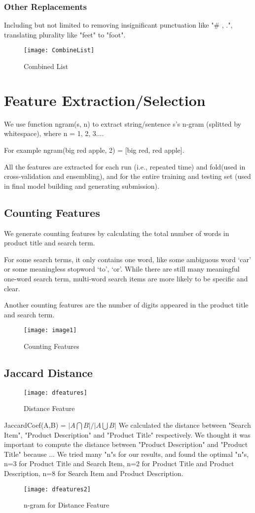 \documentclass[journal]{IEEEtran}
\begin{document}
\subsubsection{Other Replacements}
Including but not limited to removing insignificant punctuation like "\# , .", translating plurality like "feet" to "foot".
\begin{figure}[htbp] 
\centering\texttt{[image: CombineList]} 
\caption{Combined List}\label{fig:3} 
\end{figure} 
\section{Feature Extraction/Selection}
We use function ngram(s, n) to extract string/sentence s’s n-gram (splitted by whitespace), where n = 1, 2, 3....

For example ngram(big red apple, 2) = [big red, red apple].

All the features are extracted for each run (i.e., repeated time) and fold(used in cross-validation and ensembling), and for the entire training and testing set (used in final model building and generating submission).
\subsection{Counting Features}
We generate counting features by calculating the total number of words in product title and search term. 

For some search terms, it only contains one word, like some ambiguous word ‘car’ or some meaningless stopword ‘to’, ‘or’. While there are still many meaningful one-word search term, multi-word search items are more likely to be specific and clear. 

Another counting features are the number of digits appeared in the product title and search term.
\begin{figure}[htbp] 
\centering\texttt{[image: image1]} 
\caption{Counting Features}\label{fig:4} 
\end{figure} 
\subsection{Jaccard Distance}
\begin{figure}[htbp] 
\centering\texttt{[image: dfeatures]} 
\caption{Distance Feature}\label{fig:5} 
\end{figure} 
JaccardCoef(A,B) = $|A\bigcap B|/|A\bigcup B|$
We calculated the distance between "Search Item", "Product Description" and "Product Title" respectively. We thought it was important to compute the distance between "Product Description" and "Product Title" because ...
We tried many "n"s for our results, and found the optimal "n"s, n=3 for Product Title and Search Item, n=2 for Product Title and Product Description, n=8 for Search Item and Product Description.
\begin{figure}[htbp] 
\centering\texttt{[image: dfeatures2]} 
\caption{n-gram for Distance Feature}\label{fig:6} 
\end{figure} 
\end{document}
